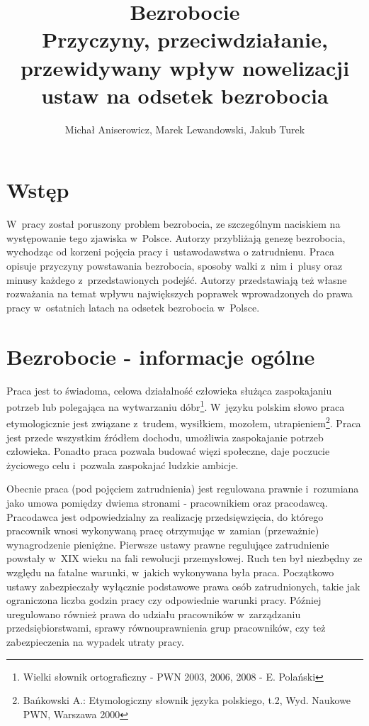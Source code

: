 \documentclass[12pt]{article}
\title{Bezrobocie \\ \Large{Przyczyny, przeciwdziałanie, przewidywany wpływ nowelizacji ustaw na odsetek bezrobocia}}
\author{Michał Aniserowicz, Marek Lewandowski, Jakub Turek}
\date{}
\begin{document}
    \maketitle
    
    \section*{Wstęp}
    
    W~pracy został poruszony problem bezrobocia, ze szczególnym naciskiem na występowanie tego zjawiska w~Polsce. Autorzy przybliżają genezę bezrobocia, wychodząc od korzeni pojęcia pracy i~ustawodawstwa o zatrudnienu. Praca opisuje przyczyny powstawania bezrobocia, sposoby walki z~nim i~plusy oraz minusy każdego z~przedstawionych podejść. Autorzy przedstawiają też własne rozważania na temat wpływu największych poprawek wprowadzonych do prawa pracy w~ostatnich latach na odsetek bezrobocia w~Polsce.
    
    \section*{Bezrobocie - informacje ogólne}
    
    Praca jest to świadoma, celowa działalność człowieka służąca zaspokajaniu potrzeb lub polegająca na wytwarzaniu dóbr\footnote{Wielki słownik ortograficzny - PWN 2003, 2006, 2008 - E. Polański}. W~języku polskim słowo praca etymologicznie jest związane z~trudem, wysiłkiem, mozołem, utrapieniem\footnote{Bańkowski A.: Etymologiczny słownik języka polskiego, t.2, Wyd. Naukowe PWN, Warszawa 2000}. Praca jest przede wszystkim źródłem dochodu, umożliwia zaspokajanie potrzeb człowieka. Ponadto praca pozwala budować więzi społeczne, daje poczucie życiowego celu i~pozwala zaspokajać ludzkie ambicje. 
    
    Obecnie praca (pod pojęciem zatrudnienia) jest regulowana prawnie i~rozumiana jako umowa pomiędzy dwiema stronami - pracownikiem oraz pracodawcą. Pracodawca jest odpowiedzialny za realizację przedsięwzięcia, do którego pracownik wnosi wykonywaną pracę otrzymując w~zamian (przeważnie) wynagrodzenie pieniężne. Pierwsze ustawy prawne regulujące zatrudnienie powstały w~XIX wieku na fali rewolucji przemysłowej. Ruch ten był niezbędny ze względu na fatalne warunki, w~jakich wykonywana była praca. Początkowo ustawy zabezpieczały wyłącznie podstawowe prawa osób zatrudnionych, takie jak ograniczona liczba godzin pracy czy odpowiednie warunki pracy. Później uregulowano również prawa do udziału pracowników w~zarządzaniu przedsiębiorstwami, sprawy równouprawnienia grup pracowników, czy też zabezpieczenia na wypadek utraty pracy.
    
\end{document}
